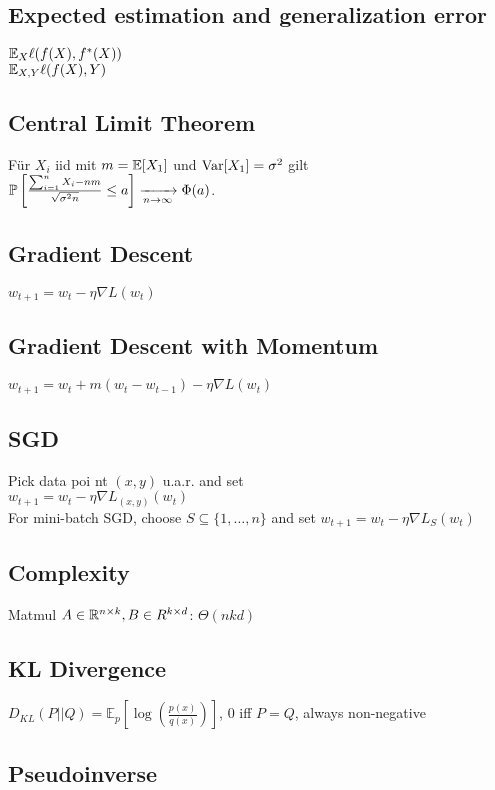 \subsection*{Expected estimation and generalization error}
$\E_{X}\ell(f(X), f^\ast(X))$ \\ 
$\E_{X,Y}\ell(f(X), Y)$

\subsection*{Central Limit Theorem}

Für $X_i$ iid mit $m = \E[X_1]$ und $\Var[X_1] = \sigma^2$ gilt $\P\left[\frac{\sum_{i=1}^n X_i - n m}{\sqrt{\sigma^2 n}} \leq a\right] \xrightarrow[n \to \infty]{} \Phi(a)$.

\subsection*{Gradient Descent}
$w_{t+1} = w_t - \eta \nabla L(w_t)$
\subsection*{Gradient Descent with Momentum} $w_{t+1}=w_t+m(w_t-w_{t-1})-\eta \nabla L(w_t)$
\subsection*{SGD}
Pick data poi nt $(x,y)$ u.a.r. and set\\  $w_{t+1} = w_t - \eta \nabla L_{(x,y)}(w_t)$ \\ For mini-batch SGD, choose $S \subseteq \{1, \ldots, n\}$ and set $w_{t+1} = w_t - \eta \nabla L_{S}(w_t)$
\subsection*{Complexity}
Matmul $A\in\R^{n\times k},B\in R^{k\times d}$: $\Theta(n k d)$

\subsection*{KL Divergence}
$D_{KL}(P||Q) = \mathbb{E}_p[\log(\frac{p(x)}{q(x)})]$, 0 iff $P = Q$, always non-negative
\\

\subsection*{Pseudoinverse}

